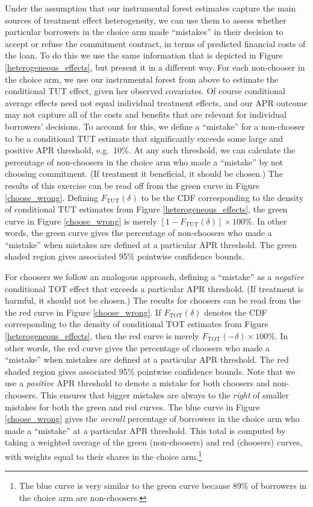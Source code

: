 \documentclass[oneside,11pt]{article}
\begin{document}
Under the assumption that our instrumental forest estimates capture the main sources of treatment effect heterogeneity, we can use them to assess whether particular borrowers in the choice arm made ``mistakes'' in their decision to accept or refuse the commitment contract, in terms of predicted financial costs of the loan.
To do this we use the same information that is depicted in Figure \ref{heterogeneous_effects}, but present it in a different way.
For each non-chooser in the choice arm, we use our instrumental forest from above to estimate the conditional TUT effect, given her observed covariates.
Of course conditional average effects need not equal individual treatment effects, and our APR outcome may not capture all of the costs and benefits that are relevant for individual borrowers' decisions.
To account for this, we define a ``mistake'' for a non-chooser to be a conditional TUT estimate that significantly exceeds some large and positive APR threshold, e.g.\ 10\%. 
At any such threshold, we can calculate the percentage of non-choosers in the choice arm who made a ``mistake'' by not choosing commitment.   
(If treatment it beneficial, it should be chosen.)
The results of this exercise can be read off from the green curve in Figure \ref{choose_wrong}.
Defining $F_{\text{TUT}}(\delta)$ to be the CDF corresponding to the density of conditional TUT estimates from Figure \ref{heterogeneous_effects}, the green curve in Figure \ref{choose_wrong} is merely $[1 - F_{\text{TUT}}(\delta)] \times 100\%$.
In other words, the green curve gives the percentage of non-choosers who made a ``mistake'' when mistakes are defined at a particular APR threshold.
The green shaded region gives associated 95\% pointwise confidence bounds.

For choosers we follow an analogous approach, defining a ``mistake'' as a \emph{negative} conditional TOT effect that exceeds a particular APR threshold.
(If treatment is harmful, it should not be chosen.)
The results for choosers can be read from the the red curve in Figure \ref{choose_wrong}.
If $F_{\text{TOT}}(\delta)$ denotes the CDF corresponding to the density of conditional TOT estimates from Figure \ref{heterogeneous_effects}, then the red curve is merely $F_{\text{TOT}}(-\delta) \times 100\%$.
In other words, the red curve gives the percentage of choosers who made a ``mistake'' when mistakes are defined at a particular APR threshold.
The red shaded region gives associated 95\% pointwise confidence bounds.
Note that we use a \emph{positive} APR threshold to denote a mistake for both choosers and non-choosers. 
This ensures that bigger mistakes are always to the \emph{right} of smaller mistakes for both the green and red curves.
The blue curve in Figure \ref{choose_wrong} gives the \emph{overall} percentage of borrowers in the choice arm who made a ``mistake'' at a particular APR threshold.
This total is computed by taking a weighted average of the green (non-choosers) and red (choosers) curves, with weights equal to their shares in the choice arm.\footnote{The blue curve is very similar to the green curve because 89\% of borrowers in the choice arm are non-choosers.}
\end{document}
